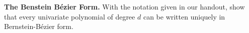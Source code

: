 \textbf{The Benstein B\'ezier Form.} With the notation given in our
handout, show that every univariate polynomial of degree $d$ can be
written uniquely in Bernstein-B\'ezier form.
